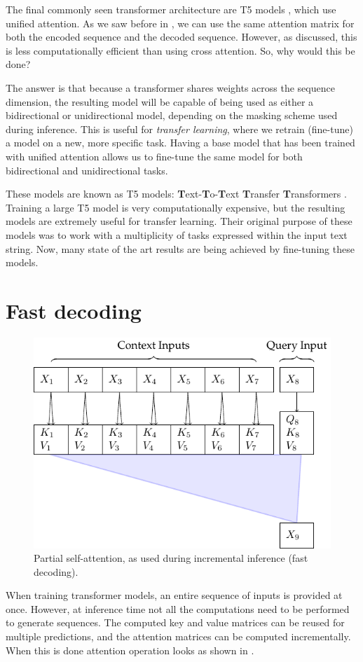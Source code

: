 The final commonly seen transformer architecture are T5 models \cite{t5}, which use unified attention. As we saw before in , we can use the same attention matrix for both the encoded sequence and the decoded sequence. However, as discussed, this is less computationally efficient than using cross attention. So, why would this be done?

The answer is that because a transformer shares weights across the sequence dimension, the resulting model will be capable of being used as either a bidirectional or unidirectional model, depending on the masking scheme used during inference. This is useful for \textit{transfer learning}, where we retrain (fine-tune) a model on a new, more specific task. Having a base model that has been trained with unified attention allows us to fine-tune the same model for both bidirectional and unidirectional tasks.

These models are known as T5 models: \textbf{T}ext-\textbf{T}o-\textbf{T}ext \textbf{T}ransfer \textbf{T}ransformers \cite{t5}. Training a large T5 model is very computationally expensive, but the resulting models are extremely useful for transfer learning. Their original purpose of these models was to work with a multiplicity of tasks
expressed within the input text string. Now, many state of the art results are being achieved by fine-tuning these models.

\section{Fast decoding}
\label{sec:fast-decoding}

\begin{figure}
    \centering
    \includegraphics[]{figures/attn-4-partial.pdf}
    \caption[Partial self-attention]{Partial self-attention, as used during incremental inference (fast decoding).}
    \hrulefill
    \label{fig:partial-self-attn}
\end{figure}

When training transformer models, an entire sequence of inputs is provided at once. However, at inference time not all the computations need to be performed to generate sequences. The computed key and value matrices can be reused for multiple predictions, and the attention matrices can be computed incrementally. When this is done attention operation looks as shown in .

